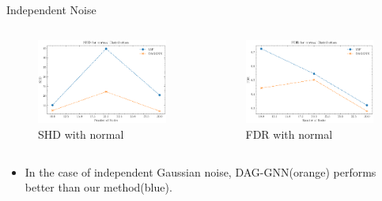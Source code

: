 \documentclass{beamer}
\begin{document}
\begin{frame}{Independent Noise}
    \begin{columns}
        \begin{column}{0.5\textwidth}
            \begin{figure}
                \centering
                \includegraphics[width=\textwidth]{fig/SHD_independence_normal.pdf}
                \caption{SHD with normal}
                \label{fig:ind_gaussian_shd}
            \end{figure}
        \end{column}
        \begin{column}{0.5\textwidth}
            \begin{figure}
                \centering
                \includegraphics[width=\textwidth]{fig/FDR_independence_normal.pdf}
                \caption{FDR with normal}
                \label{fig:ind_gaussian_fdr}
            \end{figure}
        \end{column}
    \end{columns}
    \begin{itemize}
        \item In the case of independent Gaussian noise, DAG-GNN(orange) performs better than our method(blue).
    \end{itemize}
\end{frame}
\end{document}

